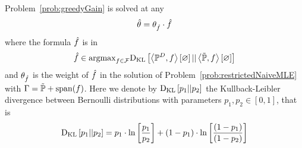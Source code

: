 \begin{theorem}
	Problem~\eqref{prob:greedyGain} is solved at any
	\begin{align*}
		\hat{\theta} = \theta_{\hat{f}} \cdot \hat{f}
	\end{align*}
	where the formula $\hat{f}$ is in
	\begin{align*}
		\hat{f} \in \mathrm{argmax}_{f\in\mathcal{F}} \mathrm{D}_{\mathrm{KL}}\left[ \left\langle \mathbb{P}^{D},f\right\rangle \left[ \varnothing \right] || \left\langle \tilde{\mathbb{P}},f\right\rangle \left[ \varnothing \right] \right]
	\end{align*}
	and $\theta_{\hat{f}}$ is the weight of $\hat{f}$ in the solution of Problem~\ref{prob:restrictedNaiveMLE} with $\Gamma = \tilde{\mathbb{P}} + \mathrm{span}(f)$.
	Here we denote by $\mathrm{D}_{\mathrm{KL}}\left[ p_1 || p_2 \right]$ the Kullback-Leibler divergence between Bernoulli distributions with parameters $p_1,p_2\in[0,1]$, that is
		\[ \mathrm{D}_{\mathrm{KL}}\left[ p_1 || p_2 \right] = p_1 \cdot \ln \left[ \frac{p_1}{p_2} \right] + (1-p_1) \cdot \ln \left[ \frac{(1-p_1)}{(1-p_2)} \right]  \]
\end{theorem}
